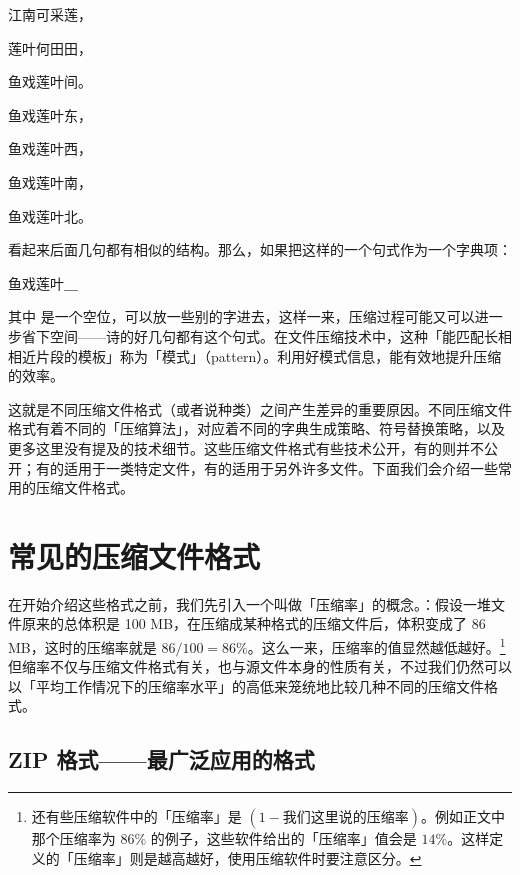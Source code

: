 \begin{quoting}
  \centering
  江南可采莲，\par
  莲叶何田田，\par
  鱼戏莲叶间。\par
  鱼戏莲叶东，\par
  鱼戏莲叶西，\par
  鱼戏莲叶南，\par
  鱼戏莲叶北。
\end{quoting}

看起来后面几句都有相似的结构。那么，如果把这样的一个句式作为一个字典项：

\begin{MissingVerbatim}
  鱼戏莲叶＿
\end{MissingVerbatim}

其中  是一个空位，可以放一些别的字进去，这样一来，压缩过程可能又可以进一步省下空间——诗的好几句都有这个句式。在文件压缩技术中，这种「能匹配长相相近片段的模板」称为「模式」（pattern）。利用好模式信息，能有效地提升压缩的效率。

这就是不同压缩文件格式（或者说种类）之间产生差异的重要原因。不同压缩文件格式有着不同的「压缩算法」，对应着不同的字典生成策略、符号替换策略，以及更多这里没有提及的技术细节。这些压缩文件格式有些技术公开，有的则并不公开；有的适用于一类特定文件，有的适用于另外许多文件。下面我们会介绍一些常用的压缩文件格式。

\section{常见的压缩文件格式}

在开始介绍这些格式之前，我们先引入一个叫做「压缩率」的概念。：假设一堆文件原来的总体积是 100 MB，在压缩成某种格式的压缩文件后，体积变成了 86 MB，这时的压缩率就是 $86/100 = 86\%$。这么一来，压缩率的值显然越低越好。\footnote{还有些压缩软件中的「压缩率」是 $(1 - \text{我们这里说的压缩率})$。例如正文中那个压缩率为 $86\%$ 的例子，这些软件给出的「压缩率」值会是 $14\%$。这样定义的「压缩率」则是越高越好，使用压缩软件时要注意区分。}但缩率不仅与压缩文件格式有关，也与源文件本身的性质有关，不过我们仍然可以以「平均工作情况下的压缩率水平」的高低来笼统地比较几种不同的压缩文件格式。

\subsection{ZIP 格式——最广泛应用的格式}

